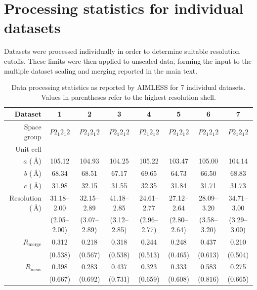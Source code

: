 \documentclass{article}
\begin{document}
\section{Processing statistics for individual datasets}

Datasets were processed individually in order to determine suitable resolution
cutoffs. These limits were then applied to unscaled data, forming the input to
the multiple dataset scaling and merging reported in the main text.

\begin{table}[H]
\label{tab:quality-stats-individual}
\caption{
  Data processing statistics as reported by AIMLESS for 7 individual datasets.
  Values in parentheses refer to the highest resolution shell.
}
\begin{tabular}{rSSSSSSS}
  \toprule
  Dataset & 1 & 2 & 3 & 4 & 5 & 6 & 7\\
  \midrule
  Space group & ${P 2_1 2_1 2}$ & ${P 2_1 2_1 2}$ & ${P 2_1 2_1 2}$ & ${P 2_1 2_1 2}$ & ${P 2_1 2_1 2}$ & ${P 2_1 2_1 2}$ & ${P 2_1 2_1 2}$ \\
  \addlinespace
  Unit cell\\
  $a$ ($\SI{}{\angstrom}$) & 105.12 & 104.93 & 104.25 & 105.22 & 103.47 & 105.00 & 104.14 \\
  $b$ ($\SI{}{\angstrom}$) & 68.34  & 68.51  & 67.17  & 69.65  & 64.73  & 66.50  & 68.83  \\
  $c$ ($\SI{}{\angstrom}$) & 31.98  & 32.15  & 31.55  & 32.35  & 31.84  & 31.71  & 31.73  \\
  \addlinespace
  Resolution ($\SI{}{\angstrom}$) & {31.18--2.00}  & {32.15--2.89}  & {41.18--2.85}  & {24.61--2.77}  & {27.12--2.64}  & {28.09--3.20}  & {34.71--3.00} \\
                                  & {(2.05--2.00)} & {(3.07--2.89)} & {(3.12--2.85)} & {(2.96--2.77)} & {(2.80--2.64)} & {(3.58--3.20)} & {(3.29--3.00)} \\
  \addlinespace
  $R_\textrm{merge}$ & 0.312  & 0.218   & 0.318   & 0.244   & 0.248   & 0.437   & 0.210 \\
                     &(0.538) & (0.567) & (0.538) & (0.513) & (0.465) & (0.613) & (0.504) \\
  \addlinespace
  $R_\textrm{meas}$  & 0.398  & 0.283   & 0.437   & 0.323   & 0.333   & 0.583   & 0.275  \\
                     &(0.667) & (0.692) & (0.731) & (0.659) & (0.608) & (0.816) & (0.665) \\

\end{tabular}
\end{table}
\end{document}
